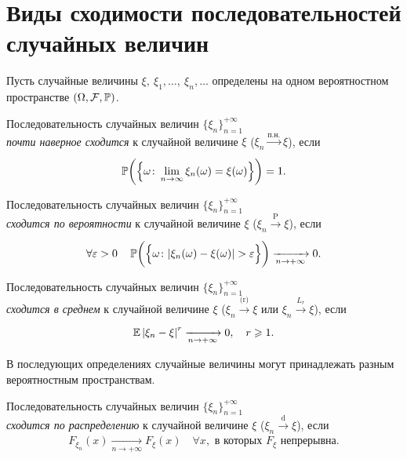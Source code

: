 \section{Виды сходимости последовательностей случайных величин}
Пусть случайные величины $\xi, \: \xi_1, \ldots, \: \xi_n, \ldots$ определены на одном вероятностном пространстве $\left(\Omega, \mathcal{F}, \operatorname{\mathbb{P}}\right)$.

\begin{defn}
    Последовательность случайных величин $\{\xi_n\}_{n = 1}^{+\infty}$ \\ 
    \textit{почти наверное сходится} к случайной величине $\xi$ ($\xi_n \xrightarrow[]{\text{п.н.}} \xi$), если
    \begin{equation*}
        \operatorname{\mathbb{P}}\biggl(\left\{\omega \colon \lim\limits _{n \to \infty} \xi_{n}(\omega)=\xi(\omega)\right\}\biggr)=1.
    \end{equation*}
\end{defn}

\begin{defn}
    Последовательность случайных величин $\{\xi_n\}_{n = 1}^{+\infty}$ \\
    \textit{сходится по вероятности} к случайной величине $\xi$ ($\xi_n \xrightarrow[]{\text{P}} \xi$), если
    \begin{equation*}
        \forall \varepsilon>0 \quad \MyPr \biggl( \Bigl\{ \omega \colon |\xi_{n}(\omega)-\xi(\omega)|>\varepsilon \Bigr\} \biggr) \xrightarrow[n \to +\infty]{} 0.
    \end{equation*}
\end{defn}

\begin{defn}
    Последовательность случайных величин $\{\xi_n\}_{n=1}^{+\infty}$ \\
    \textit{сходится в среднем} к случайной величине $\xi$ ($\xi_n \xrightarrow[]{\text{(r)}} \xi$ или $\xi_n \xrightarrow[]{L_r} \xi$), если
    \begin{equation*}
        \operatorname{\mathbb{E}} \left|\xi_{n}-\xi\right|^{r} \xrightarrow[n \to +\infty]{} 0, \quad r \geqslant 1.
    \end{equation*}
\end{defn}

В последующих определениях случайные величины могут принадлежать разным вероятностным пространствам.
\begin{defn}
    Последовательность случайных величин $\{\xi_n\}_{n=1}^{+\infty}$ \\
    \textit{сходится по распределению} к случайной величине $\xi$ ($\xi_n \xrightarrow[]{\text{d}} \xi$), если
    \begin{equation*}
        F_{\xi_n}(x) \xrightarrow[n \to +\infty]{} F_{\xi}(x) \quad \forall x, \text{ в которых } F_{\xi} \text{ непрерывна}.
    \end{equation*}
\end{defn}

